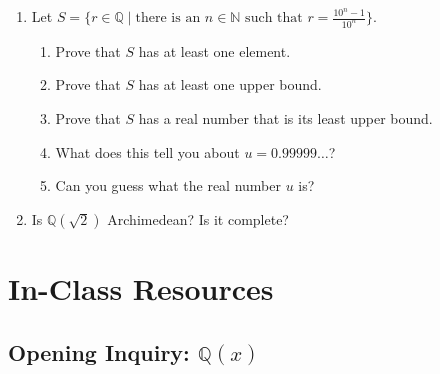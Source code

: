 \documentclass[11pt]{article}
\theoremstyle{definition}
\begin{document}
\begin{enumerate}
\item Let $S=\{r\in \mathbb{Q} \mid\text{there is an } n\in \mathbb{N} \text{ such that }r=\frac{10^{n}-1}{10^{n}}\}$.
\begin{enumerate}
\item Prove that $S$ has at least one element.
\item Prove that $S$ has at least one upper bound.
\item Prove that $S$ has a real number that is its least upper bound.
\item What does this tell you about $u=0.99999\dots$?
\item Can you guess what the real number $u$ is?
\end{enumerate}

\item Is $\mathbb{Q}(\sqrt{2})$ Archimedean? Is it complete?

\end{enumerate}

\section{In-Class Resources}

\newpage 
\subsection{Opening Inquiry: $\mathbb{Q}(x)$}
\end{document}
